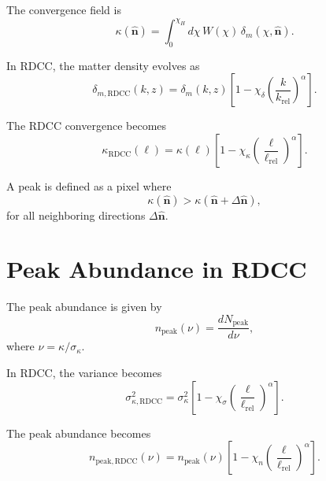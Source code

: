\documentclass[11pt,a4paper]{article}
\begin{document}
The convergence field is
\begin{equation}
    \kappa(\hat{\mathbf{n}})
    = \int_{0}^{\chi_{H}}
      d\chi\,
      W(\chi)\,
      \delta_{m}\left(\chi,\hat{\mathbf{n}}\right).
\end{equation}

In RDCC, the matter density evolves as
\begin{equation}
    \delta_{m,\mathrm{RDCC}}(k,z)
    = \delta_{m}(k,z)
      \left[
        1 - \chi_{\delta}
        \left(\frac{k}{k_{\mathrm{rel}}}\right)^{\alpha}
      \right].
\end{equation}

The RDCC convergence becomes
\begin{equation}
    \kappa_{\mathrm{RDCC}}(\ell)
    = \kappa(\ell)
      \left[
        1 - \chi_{\kappa}
        \left(\frac{\ell}{\ell_{\mathrm{rel}}}\right)^{\alpha}
      \right].
\end{equation}

A peak is defined as a pixel where
\begin{equation}
    \kappa(\hat{\mathbf{n}}) > \kappa(\hat{\mathbf{n}} + \Delta\hat{\mathbf{n}}),
\end{equation}
for all neighboring directions $\Delta\hat{\mathbf{n}}$.
\section{Peak Abundance in RDCC}

The peak abundance is given by
\begin{equation}
    n_{\mathrm{peak}}(\nu)
    = \frac{dN_{\mathrm{peak}}}{d\nu},
\end{equation}
where $\nu = \kappa / \sigma_{\kappa}$.

In RDCC, the variance becomes
\begin{equation}
    \sigma_{\kappa,\mathrm{RDCC}}^{2}
    = \sigma_{\kappa}^{2}
      \left[
        1 - \chi_{\sigma}
        \left(\frac{\ell}{\ell_{\mathrm{rel}}}\right)^{\alpha}
      \right].
\end{equation}

The peak abundance becomes
\begin{equation}
    n_{\mathrm{peak,RDCC}}(\nu)
    = n_{\mathrm{peak}}(\nu)
      \left[
        1 - \chi_{n}
        \left(\frac{\ell}{\ell_{\mathrm{rel}}}\right)^{\alpha}
      \right].
\end{equation}
\end{document}
